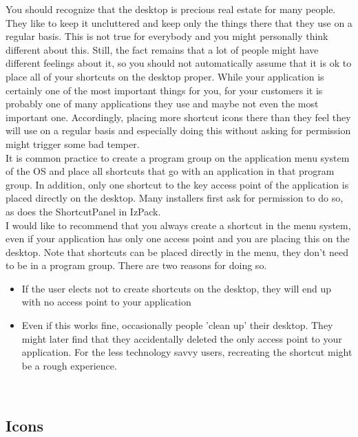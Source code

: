You should recognize that the desktop is precious real estate for many
people. They like to keep it uncluttered and keep only the things there
that they use on a regular basis. This is not true for everybody and you
might personally think different about this. Still, the fact remains
that a lot of people might have different feelings about it, so you
should not automatically assume that it is ok to place all of your
shortcuts on the desktop proper. While your application is certainly one
of the most important things for you, for your customers it is probably
one of many applications they use and maybe not even the most important
one. Accordingly, placing more shortcut icons there than they feel they
will use on a regular basis and especially doing this without asking for
permission might trigger some bad temper.\\

It is common practice to create a program group on the application menu
system of the OS and place all shortcuts that go with an application in
that program group. In addition, only one shortcut to the key access
point of the application is placed directly on the desktop. Many
installers first ask for permission to do so, as does the ShortcutPanel
in IzPack.\\

I would like to recommend that you always create a shortcut in the menu
system, even if your application has only one access point and you are
placing this on the desktop. Note that shortcuts can be placed directly
in the menu, they don't need to be in a program group. There are two
reasons for doing so.\\

\begin{itemize}
\item If the user elects not to create shortcuts on the desktop, they
      will end up with no access point to your application
\item Even if this works fine, occasionally people 'clean up' their
      desktop. They might later find that they accidentally deleted the
      only access point to your application. For the less technology
      savvy users, recreating the shortcut might be a rough experience.
\end{itemize}\

\subsection{Icons}

